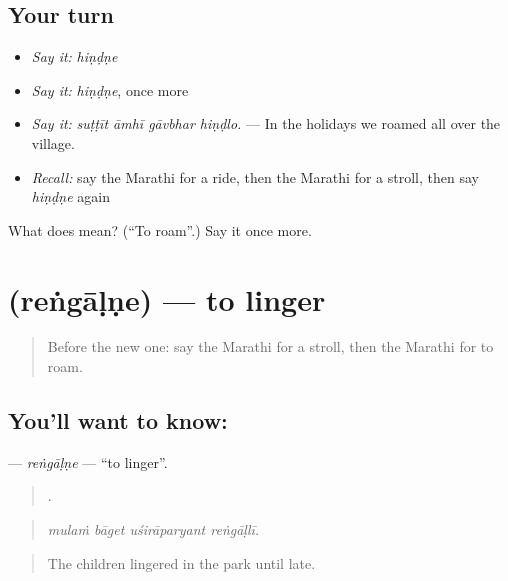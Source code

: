 \subsection*{Your turn}
\begin{itemize}
\raggedright
  \item \emph{Say it:} \emph{hiṇḍṇe}
  \item \emph{Say it:} \emph{hiṇḍṇe}, once more
  \item \emph{Say it:} \emph{suṭṭīt āmhī gāvbhar hiṇḍlo.} — In the holidays we roamed all over the village.
  \item \emph{Recall:} say the Marathi for a ride, then the Marathi for a stroll, then say \emph{hiṇḍṇe} again
\end{itemize}

\begin{tcolorbox}[breakable,colback=teal!4,colframe=teal!35!black,title={Before you move on}]
What does  mean? (\textquotedblleft{}To roam\textquotedblright{}.) Say it once more.
\end{tcolorbox}
\section[\texorpdfstring{\mr{रेंगाळणे} (reṅgāḷṇe)}{रेंगाळणे (reṅgāḷṇe)}]{ (reṅgāḷṇe) — to linger}

\label{lesson:MR-C411-rengalne}



\begin{quote}
Before the new one: say the Marathi for a stroll, then the Marathi for to roam.
\end{quote}

\subsection*{You'll want to know: }
\textbf{} — \emph{reṅgāḷṇe} — \textquotedblleft{}to linger\textquotedblright{}.

\begin{quote}
   .
\end{quote}

\begin{quote}
\emph{mulaṁ bāget uśirāparyant reṅgāḷlī.}
\end{quote}

\begin{quote}
The children lingered in the park until late.
\end{quote}

